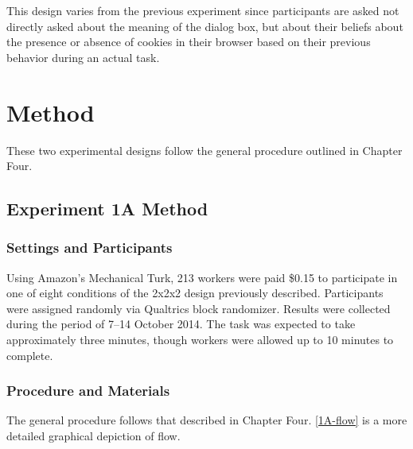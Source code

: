 This design varies from the previous experiment since participants are asked not directly asked about the meaning of the dialog box, but about their beliefs about the presence or absence of cookies in their browser based on their previous behavior during an actual task. 

\section{Method}
\label{method}

These two experimental designs follow the general procedure outlined in Chapter Four.

\subsection{Experiment 1A Method}
\label{experiment1amethod}

\subsubsection{Settings and Participants}
\label{settingsandparticipants}

Using Amazon's Mechanical Turk, 213 workers were paid \$0.15 to participate in one of eight conditions of the 2x2x2 design previously described. Participants were assigned randomly via Qualtrics block randomizer. Results were collected during the period of 7--14 October 2014. The task was expected to take approximately three minutes, though workers were allowed up to 10 minutes to complete.

\subsubsection{Procedure and Materials}
\label{procedureandmaterials}

The general procedure follows that described in Chapter Four.  \autoref{1A-flow}  is a more detailed graphical depiction of flow.

